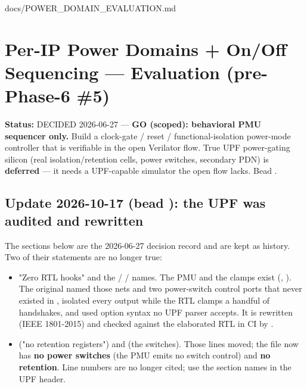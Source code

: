 \begin{relocated}{docs/POWER_DOMAIN_EVALUATION.md}
\section{Per-IP Power Domains + On/Off Sequencing --- Evaluation
(pre-Phase-6 \#5)}\label{tm:pd:power-domain-evaluation}

\textbf{Status:} DECIDED 2026-06-27 --- \textbf{GO (scoped): behavioral
PMU sequencer only.} Build a clock-gate / reset / functional-isolation
power-mode controller that is verifiable in the open Verilator flow.
True UPF power-gating silicon (real isolation/\allowbreak{}retention
cells, power switches, secondary PDN) is \textbf{deferred} --- it needs
a UPF-capable simulator the open flow lacks. Bead
.

\subsection{\texorpdfstring{Update 2026-10-17 (bead ): the
UPF was audited and
rewritten}{Update 2026-10-17 (bead ): the UPF was audited and rewritten}}\label{tm:pd:power-domain-evaluation:update-2026-10-17-bead-h3lm-the-upf-was-audited-and-rewritten}

The sections below are the 2026-06-27 decision record and are kept as
history. Two of their statements are no longer true:

\begin{itemize}
\tightlist
\item
  "Zero RTL hooks" and the  /  /
   names. The PMU and the clamps exist (,
  ). The original  named those
  nets and two power-switch control ports that never existed in
  , isolated every output while the RTL clamps a handful
  of handshakes, and used option syntax no UPF parser accepts. It is
  rewritten (IEEE 1801-2015) and checked against the elaborated RTL in
  CI by .
\item
   ("no retention registers") and
   (the switches). Those lines moved; the file now
  has \textbf{no power switches} (the PMU emits no switch control) and
  \textbf{no retention}. Line numbers are no longer cited; use the
  section names in the UPF header.
\end{itemize}


\end{relocated}
